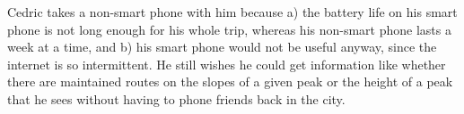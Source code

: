 \documentclass{article}
\begin{document}
Cedric takes a non-smart phone with him because a) the battery life on his smart phone is not long enough for his whole trip, whereas his non-smart phone lasts a week at a time, and b) his smart phone would not be useful anyway, since the internet is so intermittent.  He still wishes he could get information like whether there are maintained routes on the slopes of a given peak or the height of a peak that he sees without having to phone friends back in the city.
\end{document}
